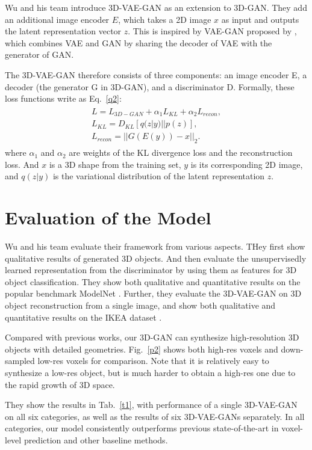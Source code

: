 \documentclass[10pt,twocolumn,letterpaper]{article}
\begin{document}
Wu and his team introduce 3D-VAE-GAN as an extension to 3D-GAN. They add an additional image encoder $E$, which takes a 2D image $x$ as input and outputs the latent representation vector $z$. This is inspired by VAE-GAN proposed by \cite{Larsen2016Autoencoding}, which combines VAE and GAN by sharing the decoder of VAE with the generator of GAN.

The 3D-VAE-GAN therefore consists of three components: an image encoder E, a decoder (the generator G in 3D-GAN), and a discriminator D. Formally, these loss functions write as Eq.~\ref{q2}:
\begin{equation}
\begin{aligned}
\begin{split} L=L_{3D-GAN}+\alpha_1L_{KL}+\alpha_2L_{recon},\\
L_{KL}=D_{KL}[q(z|y)||p(z)],\\ 
L_{recon}=||G(E(y))-x||_2.
\label{q2}
\end{split}
\end{aligned}
\end{equation}
where $\alpha_1$ and $\alpha_2$ are weights of the KL divergence loss and the reconstruction loss.  And $x$ is a 3D shape from the training set, $y$ is its corresponding 2D image, and $q(z|y)$ is the variational distribution of the latent representation $z$.

\section{Evaluation of the Model}

Wu and his team evaluate their framework from various aspects. THey first show qualitative results of generated 3D objects. And then evaluate the unsupervisedly learned representation from the discriminator by using them as features for 3D object classification. They show both qualitative and quantitative results on the popular benchmark ModelNet \cite{Wu2016Learning}. Further, they evaluate the 3D-VAE-GAN on 3D object reconstruction from a single image, and show both qualitative and quantitative results on the IKEA dataset \cite{Lim2014Parsing}.

Compared with previous works, our 3D-GAN can synthesize high-resolution 3D objects with detailed geometries. Fig.~\ref{p2} shows both high-res voxels and down-sampled low-res voxels for comparison. Note that it is relatively easy to synthesize a low-res object, but is much harder to obtain a high-res one due to the rapid growth of 3D space.

They show the results in Tab.~\ref{t1}, with performance of a single 3D-VAE-GAN on all six categories, as well as the results of six 3D-VAE-GANs separately. In all categories, our model consistently outperforms previous state-of-the-art in voxel-level prediction and other baseline methods.


{\small


}
\end{document}
